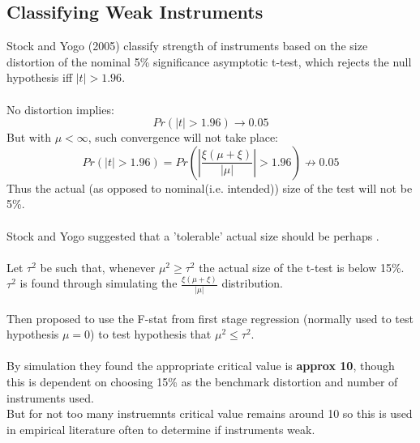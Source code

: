 \documentclass[DIV=14,titlepage=false]{scrreprt}
\begin{document}
\subsection{Classifying Weak Instruments}
Stock and Yogo (2005) classify strength of instruments based on the size distortion of the nominal 5\% significance asymptotic t-test, which rejects the null hypothesis iff \(|t|>1.96\).
\\ \\ No distortion implies:
\[Pr(|t|>1.96)\rightarrow0.05\]
But with \(\mu<\infty\), such convergence will not take place:
\[Pr(|t|>1.96)=Pr\left(|\frac{\xi(\mu+\xi)}{|\mu|}|>1.96\right)\nrightarrow0.05\]
Thus the actual (as opposed to nominal(i.e. intended)) size of the test will not be 5\%.
\\ \\ Stock and Yogo suggested that a 'tolerable' actual size should be perhaps \underline{}.
\\ \\ Let \(\tau^2\) be such that, whenever \(\mu^2\geq\tau^2\) the actual size of the t-test is below 15\%. \(\tau^2\) is found through simulating the \(\frac{\xi(\mu+\xi)}{|\mu|}\) distribution.
\\ \\ Then proposed to use the F-stat from first stage regression (normally used to test hypothesis \(\mu=0\)) to test hypothesis that \(\mu^2\leq\tau^2\).
\\ \\ By simulation they found the appropriate critical value is \textbf{approx 10}, though this is dependent on choosing 15\% as the benchmark distortion and number of instruments used.
\\ But for not too many instruemnts critical value remains around 10 so this is used in empirical literature often to determine if instruments weak.
\end{document}
